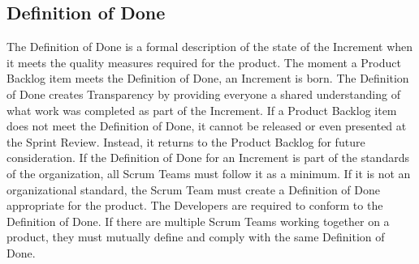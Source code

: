 \subsection{Definition of Done}\label{scrum-definition-of-done}

\begin{flushleft}
	The Definition of Done is a formal description of the state of the Increment when
	it meets the quality measures required for the product. The moment a Product Backlog
	item meets the Definition of Done, an Increment is born. The Definition of Done
	creates Transparency by providing everyone a shared understanding of what work
	was completed as part of the Increment. If a Product Backlog item does not meet
	the Definition of Done, it cannot be released or even presented at the Sprint Review.
	Instead, it returns to the Product Backlog for future consideration. If the Definition
	of Done for an Increment is part of the standards of the organization, all Scrum Teams
	must follow it as a minimum. If it is not an organizational standard, the Scrum Team
	must create a Definition of Done appropriate for the product. The Developers are
	required to conform to the Definition of Done. If there are multiple Scrum Teams
	working together on a product, they must mutually define and comply with the same
	Definition of Done.
\end{flushleft}
